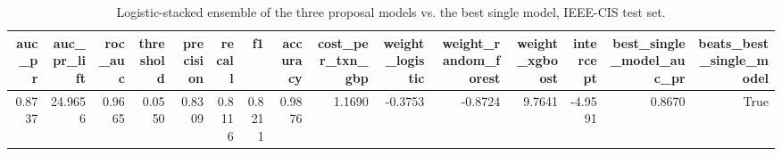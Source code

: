 \begin{table}
\caption{Logistic-stacked ensemble of the three proposal models vs. the best single model, IEEE-CIS test set.}
\label{tab:table16_stacked_ensemble}
\begin{tabular}{rrrrrrrrrrrrrrr}
\toprule
auc\_pr & auc\_pr\_lift & roc\_auc & threshold & precision & recall & f1 & accuracy & cost\_per\_txn\_gbp & weight\_logistic & weight\_random\_forest & weight\_xgboost & intercept & best\_single\_model\_auc\_pr & beats\_best\_single\_model \\
\midrule
0.8737 & 24.9656 & 0.9665 & 0.0550 & 0.8309 & 0.8116 & 0.8211 & 0.9876 & 1.1690 & -0.3753 & -0.8724 & 9.7641 & -4.9591 & 0.8670 & True \\
\bottomrule
\end{tabular}
\end{table}
